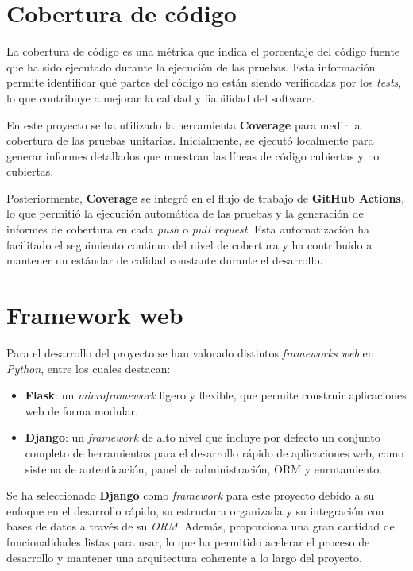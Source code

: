\section{Cobertura de código}

La cobertura de código es una métrica que indica el porcentaje del código fuente que ha sido ejecutado durante la 
ejecución de las pruebas. Esta información permite identificar qué partes del código no están siendo verificadas 
por los \textit{tests}, lo que contribuye a mejorar la calidad y fiabilidad del software.

En este proyecto se ha utilizado la herramienta \textbf{Coverage} para medir la cobertura de las pruebas unitarias. 
Inicialmente, se ejecutó localmente para generar informes detallados que muestran las líneas de código cubiertas y 
no cubiertas.

Posteriormente, \textbf{Coverage} se integró en el flujo de trabajo de \textbf{GitHub Actions}, lo que permitió la 
ejecución automática de las pruebas y la generación de informes de cobertura en cada \textit{push} o \textit{pull request}. 
Esta automatización ha facilitado el seguimiento continuo del nivel de cobertura y ha contribuido a mantener un 
estándar de calidad constante durante el desarrollo.

\section{Framework web}

Para el desarrollo del proyecto se han valorado distintos \textit{frameworks web} en \textit{Python}, entre los cuales destacan:

\begin{itemize}
    \item \textbf{Flask}: un \textit{microframework} ligero y flexible, que permite construir aplicaciones web de forma modular.~\cite{web:flask}
    \item \textbf{Django}: un \textit{framework} de alto nivel que incluye por defecto un conjunto completo de herramientas para el desarrollo rápido de aplicaciones web, como sistema de autenticación, panel de administración, ORM y enrutamiento.~\cite{web:django}
\end{itemize}

Se ha seleccionado \textbf{Django} como \textit{framework} para este proyecto debido a su enfoque en el desarrollo rápido, 
su estructura organizada y su integración con bases de datos a través de su \textit{ORM}. Además, proporciona una gran cantidad de 
funcionalidades listas para usar, lo que ha permitido acelerar el proceso de desarrollo y mantener una arquitectura 
coherente a lo largo del proyecto.

